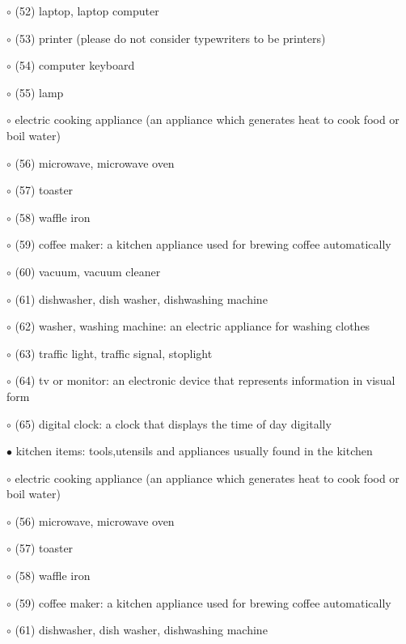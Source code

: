 \noindent \leftskip=0.5cm $\circ$ (52) laptop, laptop computer

\noindent \leftskip=0.5cm $\circ$ (53) printer (please do not consider typewriters to be printers)

\noindent \leftskip=0.5cm $\circ$ (54) computer keyboard

\noindent \leftskip=0.25cm $\circ$ (55) lamp

\noindent \leftskip=0.25cm $\circ$ electric cooking appliance (an appliance which generates heat to cook food or boil water)

\noindent \leftskip=0.5cm $\circ$ (56) microwave, microwave oven

\noindent \leftskip=0.5cm $\circ$ (57) toaster

\noindent \leftskip=0.5cm $\circ$ (58) waffle iron

\noindent \leftskip=0.5cm $\circ$ (59) coffee maker: a kitchen appliance used for brewing coffee automatically

\noindent \leftskip=0.25cm $\circ$ (60) vacuum, vacuum cleaner

\noindent \leftskip=0.25cm $\circ$ (61) dishwasher, dish washer, dishwashing machine

\noindent \leftskip=0.25cm $\circ$ (62) washer, washing machine: an electric appliance for washing clothes

\noindent \leftskip=0.25cm $\circ$ (63) traffic light, traffic signal, stoplight

\noindent \leftskip=0.25cm $\circ$ (64) tv or monitor: an electronic device that represents information in visual form

\noindent \leftskip=0.25cm $\circ$ (65) digital clock: a clock that displays the time of day digitally

\noindent \leftskip=0.0cm $\bullet$ kitchen items: tools,utensils and appliances usually found in the kitchen

\noindent \leftskip=0.25cm $\circ$ electric cooking appliance (an appliance which generates heat to cook food or boil water)

\noindent \leftskip=0.5cm $\circ$ (56) microwave, microwave oven

\noindent \leftskip=0.5cm $\circ$ (57) toaster

\noindent \leftskip=0.5cm $\circ$ (58) waffle iron

\noindent \leftskip=0.5cm $\circ$ (59) coffee maker: a kitchen appliance used for brewing coffee automatically

\noindent \leftskip=0.25cm $\circ$ (61) dishwasher, dish washer, dishwashing machine

